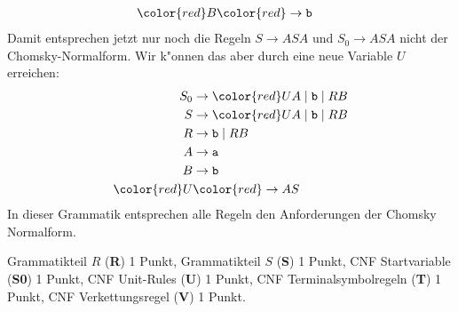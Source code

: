 \begin{loesung}
\begin{enumerate}
\begin{align*}
\color{red}B  &\color{red}\rightarrow \texttt{b}
\end{align*}
Damit entsprechen jetzt nur noch die Regeln $S\rightarrow ASA$ und
$S_0\rightarrow ASA$ nicht der Chomsky-Normalform.
Wir k"onnen das aber durch eine neue Variable $U$ erreichen:
\begin{align*}
S_0&\rightarrow {\color{red}U}A \;|\; \texttt{b} \;|\; RB \\
S  &\rightarrow {\color{red}U}A \;|\; \texttt{b} \;|\; RB \\
R  &\rightarrow \texttt{b} \;|\; RB \\
A  &\rightarrow \texttt{a} \\
B  &\rightarrow \texttt{b} \\
\color{red}U  &\color{red}\rightarrow AS
\end{align*}
In dieser Grammatik entsprechen alle Regeln den Anforderungen der
Chomsky Normalform.
\qedhere
\end{enumerate}
\end{loesung}

\begin{bewertung}
Grammatikteil $R$ ({\bf R}) 1 Punkt,
Grammatikteil $S$ ({\bf S}) 1 Punkt,
CNF Startvariable ({\bf S0}) 1 Punkt,
CNF Unit-Rules ({\bf U}) 1 Punkt,
CNF Terminalsymbolregeln ({\bf T}) 1 Punkt,
CNF Verkettungsregel ({\bf V}) 1 Punkt.
\end{bewertung}

